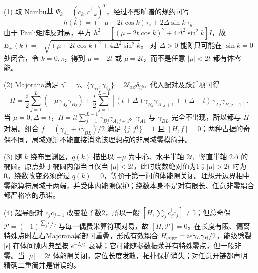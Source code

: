 (1) 取 Nambu基 \(\Psi_k=(c_k,c_{-k}^\dagger)^T\)，经过不影响谱的规约可写
\[
h(k)=(-\mu-2t\cos k)\tau_z+2\Delta\sin k\,\tau_y.
\]
由于 Pauli矩阵反对易，平方 \(h^2=[(\mu+2t\cos k)^2+4\Delta^2\sin^2k]I\)，故
\(\boxed{E_\pm(k)=\pm\sqrt{(\mu+2t\cos k)^2+4\Delta^2\sin^2k}}\)。
对 \(\Delta>0\) 能隙只可能在 \(\sin k=0\) 处闭合，令 \(k=0,\pi\)，得到 \(\mu=-2t\) 或 \(\mu=2t\)，而不是任意 \(|\mu|<2t\) 都有体零能。

(2) Majorana满足 \(\gamma^\dagger=\gamma\)、\(\{\gamma_{\alpha i},\gamma_{\beta j}\}=2\delta_{\alpha\beta}\delta_{ij}\)。代入配对及跃迁项可得
\[
H=\frac i2\sum_{j=1}^L(-\mu\gamma_{Aj}\gamma_{Bj})
+\frac i2\sum_{j=1}^{L-1}[(t+\Delta)\gamma_{Bj}\gamma_{A,j+1}+(\Delta-t)\gamma_{Aj}\gamma_{B,j+1}].
\]
当 \(\mu=0,\Delta=t\)，\(\boxed{H=it\sum_{j=1}^{L-1}\gamma_{Bj}\gamma_{A,j+1}}\)。\(\gamma_{A1}\) 与 \(\gamma_{BL}\) 完全不出现，所以都与 \(H\) 对易。组合 \(f=(\gamma_{A1}+i\gamma_{BL})/2\) 满足 \(\{f,f^\dagger\}=1\) 且 \([H,f]=0\)；两种占据的奇偶不同，局域观测不能直接消除该理想点的非局域零模简并。

(3) 随 \(k\) 绕布里渊区，\(q(k)\) 描出以 \(-\mu\) 为中心、水平半轴 \(2t\)、竖直半轴 \(2\Delta\) 的椭圆。原点处于椭圆内部当且仅当 \(\boxed{|\mu|<2t}\)，此时绕数绝对值为1；\(|\mu|>2t\) 时为0。绕数改变必须穿过 \(q(k)=0\)，等价于第一问的体能隙关闭。理想开边界相中零能算符局域于两端，并受体内能隙保护；绕数本身不是对有限长、任意非零耦合都严格零的承诺。

(4) 超导配对 \(c_jc_{j+1}\) 改变粒子数2，所以一般 \([H,\sum_jc_j^\dagger c_j]\ne0\)；但总奇偶 \(\mathcal P=(-1)^{\sum_jc_j^\dagger c_j}\) 与每一偶费米算符项对易，故 \([H,\mathcal P]=0\)。在长度有限、偏离特殊点时左右Majorana尾部可重叠，形成有效耦合 \(H_{\rm edge}=i\epsilon\,\gamma_L\gamma_R/2\)，能级劈裂 \(|\epsilon|\) 在体间隙内典型按 \(e^{-L/\xi}\) 衰减；它可能随参数振荡并有特殊零点，但一般非零。当 \(|\mu|=2t\) 体能隙关闭，定位长度发散，拓扑保护消失；对任意开链都声明精确二重简并是错误的。
